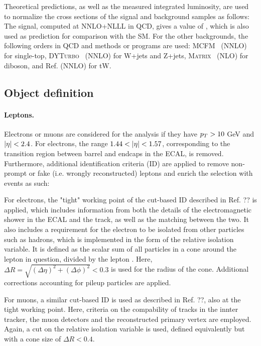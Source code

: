 Theoretical predictions, as well as the measured integrated luminosity, are used to normalize the cross sections of the signal and background samples as follows: The \ttbar signal, computed at NNLO+NLLL in QCD, gives a value of \xsecpred, which is also used as prediction for comparison with the SM. For the other backgrounds, the following orders in QCD and methods or programs are used: \textsc{MCFM}~\cite{Campbell:2020fhf} (NNLO) for single-top, \textsc{DYTurbo}~\cite{Camarda:2019zyx} (NNLO) for W+jets and Z+jets, \textsc{Matrix}~\cite{Grazzini:2017mhc} (NLO) for diboson, and Ref. \cite{Kidonakis:2021vob} (NNLO) for tW.




\subsection{Object definition}
\label{sec:ttxs:objects}

\paragraph{Leptons.}

Electrons or muons are considered for the analysis if they have $p_T > 10$ GeV and $|\eta| < 2.4$. For electrons, the range $1.44 < |\eta| < 1.57$, corresponding to the transition region between barrel and endcaps in the ECAL, is removed. Furthermore, additional identification criteria (ID) are applied to remove non-prompt or fake (i.e. wrongly reconstructed) leptons and enrich the selection with \ttbar events as such:

For electrons, the "tight" working point of the cut-based ID described in Ref. ?? is applied, which includes information from both the details of the electromagnetic shower in the ECAL and the track, as well as the matching between the two. It also includes a requirement for the electron to be isolated from other particles such as hadrons, which is implemented in the form of the relative isolation variable. It is defined as the scalar \pt sum of all particles in a cone around the lepton in question, divided by the lepton \pt. Here, $\Delta R = \sqrt{(\Delta \eta)^2 + (\Delta \phi)^2} < 0.3$ is used for the radius of the cone. Additional corrections accounting for pileup particles are applied.

For muons, a similar cut-based ID is used as described in Ref. ??, also at the tight working point. Here, criteria on the compability of tracks in the innter tracker, the muon detectors and the reconstructed primary vertex are employed. Again, a cut on the relative isolation variable is used, defined equivalently but with a cone size of $\Delta R < 0.4$.

